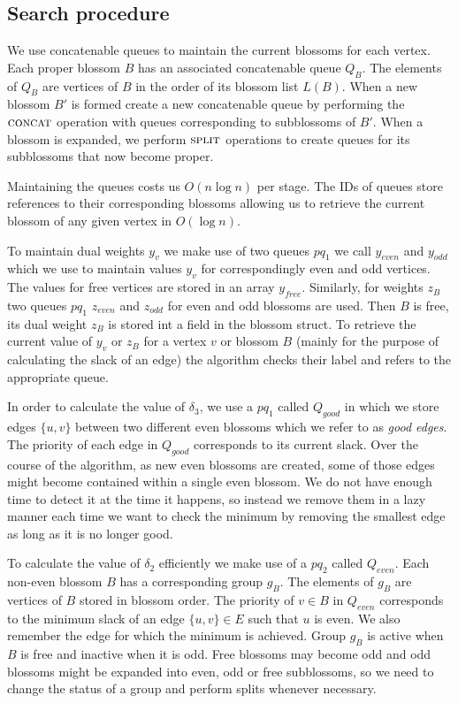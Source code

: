 \subsection{Search procedure}

We use concatenable queues to maintain the current blossoms for each vertex. Each proper blossom $B$ has an associated concatenable queue $Q_B$. The elements of $Q_B$ are vertices of $B$ in the order of its blossom list $L(B)$. When a new blossom $B'$ is formed create a new concatenable queue by performing the $\textsc{concat}$ operation with queues corresponding to subblossoms of $B'$. When a blossom is expanded, we perform $\textsc{split}$ operations to create queues for its subblossoms that now become proper.

Maintaining the queues costs us $O(n\log n)$ per stage. The IDs of queues store references to their corresponding blossoms allowing us to retrieve the current blossom of any given vertex in $O(\log n)$.

To maintain dual weights $y_v$ we make use of two queues $pq_1$ we call $y_{even}$ and $y_{odd}$ which we use to maintain values $y_v$ for correspondingly even and odd vertices. The values for free vertices are stored in an array $y_{free}$. Similarly, for weights $z_B$ two queues $pq_1$ $z_{even}$ and $z_{odd}$ for even and odd blossoms are used. Then $B$ is free, its dual weight $z_B$ is stored int a field in the blossom struct. To retrieve the current value of $y_v$ or $z_B$ for a vertex $v$ or blossom $B$ (mainly for the purpose of calculating the slack of an edge) the algorithm checks their label and refers to the appropriate queue.

In order to calculate the value of $\delta_3$, we use a $pq_1$ called $Q_{good}$ in which we store edges $\{u, v\}$ between two different even blossoms which we refer to as \textit{good edges}. The priority of each edge in $Q_{good}$ corresponds to its current slack. Over the course of the algorithm, as new even blossoms are created, some of those edges might become contained within a single even blossom. We do not have enough time to detect it at the time it happens, so instead we remove them in a lazy manner each time we want to check the minimum by removing the smallest edge as long as it is no longer good.

To calculate the value of $\delta_2$ efficiently we make use of a $pq_2$ called $Q_{even}$. Each non-even blossom $B$ has a corresponding group $g_B$. The elements of $g_B$ are vertices of $B$ stored in blossom order. The priority of $v \in B$ in $Q_{even}$ corresponds to the minimum slack of an edge $\{u, v\} \in E$ such that $u$ is even. We also remember the edge for which the minimum is achieved. Group $g_B$ is active when $B$ is free and inactive when it is odd. Free blossoms may become odd and odd blossoms might be expanded into even, odd or free subblossoms, so we need to change the status of a group and perform splits whenever necessary.

